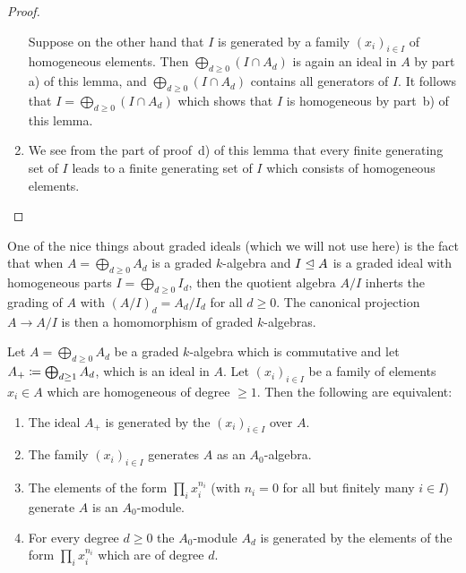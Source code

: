 \begin{proof}
\begin{enumerate}
      Suppose on the other hand that $I$ is generated by a family $(x_i)_{i \in I}$ of homogeneous elements.
      Then $\bigoplus_{d \geq 0} (I \cap A_d)$ is again an ideal in $A$ by part a) of this lemma, and $\bigoplus_{d \geq 0} (I \cap A_d)$ contains all generators of $I$.
      It follows that $I = \bigoplus_{d \geq 0} (I \cap A_d)$ which shows that $I$ is homogeneous by part~b) of this lemma.
    \item
      We see from the part of proof~d) of this lemma that every finite generating set of $I$ leads to a finite generating set of $I$ which consists of homogeneous elements.
    \qedhere
  \end{enumerate}
\end{proof}


\begin{remark}
  \label{remark: quotient by homogeneous ideals are again graded}
  One of the nice things about graded ideals (which we will not use here) is the fact that when $A = \bigoplus_{d \geq 0} A_d$ is a graded $k$-algebra and $I \trianglelefteq A$ is a graded ideal with homogeneous parts $I = \bigoplus_{d \geq 0} I_d$, then the quotient algebra $A/I$ inherts the grading of $A$ with $(A/I)_d = A_d/I_d$ for all $d \geq 0$.
  The canonical projection $A \to A/I$ is then a homomorphism of graded $k$-algebras.
\end{remark}


\begin{proposition}
  \label{proposition: homeneous generators for irrelevant ideal}
  Let $A = \bigoplus_{d \geq 0} A_d$ be a graded $k$-algebra which is commutative and let $A_+ \coloneqq \bigoplus_{d \geq 1} A_d$, which is an ideal in $A$.
  Let $(x_i)_{i \in I}$ be a family of elements $x_i \in A$ which are homogeneous of degree $\geq 1$.
  Then the following are equivalent:
  \begin{enumerate}
    \item
      The ideal $A_+$ is generated by the $(x_i)_{i \in I}$ over $A$.
    \item
      The family $(x_i)_{i \in I}$ generates $A$ as an $A_0$-algebra.
    \item
      The elements of the form $\prod_i x_i^{n_i}$ (with $n_i = 0$ for all but finitely many $i \in I$) generate $A$ is an $A_0$-module.
    \item
      For every degree $d \geq 0$ the $A_0$-module $A_d$ is generated by the elements of the form $\prod_i x_i^{n_i}$ which are of degree $d$.
  \end{enumerate}
\end{proposition}


